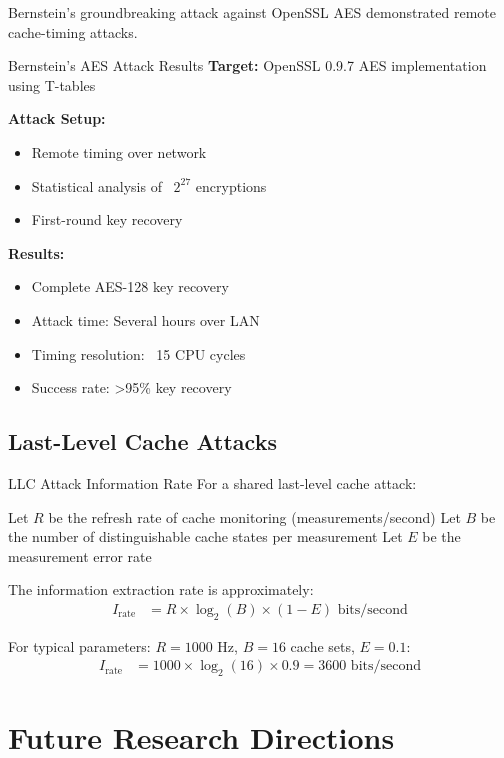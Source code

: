 \documentclass[11pt,a4paper]{article}
\theoremstyle{definition}
\begin{document}
Bernstein's groundbreaking attack against OpenSSL AES demonstrated remote cache-timing attacks.

\begin{examplebox}{Bernstein's AES Attack Results}
\textbf{Target:} OpenSSL 0.9.7 AES implementation using T-tables

\textbf{Attack Setup:}
\begin{itemize}
    \item Remote timing over network
    \item Statistical analysis of ~$2^{27}$ encryptions  
    \item First-round key recovery
\end{itemize}

\textbf{Results:}
\begin{itemize}
    \item Complete AES-128 key recovery
    \item Attack time: Several hours over LAN
    \item Timing resolution: ~15 CPU cycles
    \item Success rate: >95\% key recovery
\end{itemize}
\end{examplebox}

\subsection{Last-Level Cache Attacks}

\begin{mathematicsbox}{LLC Attack Information Rate}
For a shared last-level cache attack:

Let $R$ be the refresh rate of cache monitoring (measurements/second)
Let $B$ be the number of distinguishable cache states per measurement
Let $E$ be the measurement error rate

The information extraction rate is approximately:
\begin{align}
I_{\text{rate}} &= R \times \log_2(B) \times (1 - E) \text{ bits/second}
\end{align}

For typical parameters: $R = 1000$ Hz, $B = 16$ cache sets, $E = 0.1$:
\begin{align}
I_{\text{rate}} &= 1000 \times \log_2(16) \times 0.9 = 3600 \text{ bits/second}
\end{align}
\end{mathematicsbox}

\section{Future Research Directions}
\end{document}

